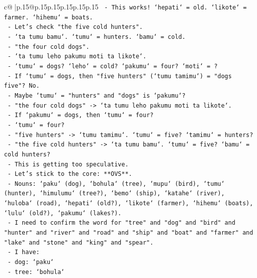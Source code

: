 \documentclass{article}
\begin{document}
{\begin{supertabular}{c@{$\;$}|p{.15\linewidth}@{}p{.15\linewidth}p{.15\linewidth}p{.15\linewidth}p{.15\linewidth}p{.15\linewidth}}
{{{\texttt{                {-} This works! `hepati` = old. `likote` = farmer. `hihemu` = boats.} \\
\texttt{                {-} Let's check "the five cold hunters".} \\
\texttt{                {-} `ta tumu bamu`. `tumu` = hunters. `bamu` = cold.} \\
\texttt{                {-} "the four cold dogs".} \\
\texttt{                {-} `ta tumu leho pakumu moti ta likote`.} \\
\texttt{                {-} `tumu` = dogs? `leho` = cold? `pakumu` = four? `moti` = ?} \\
\texttt{                {-} If `tumu` = dogs, then "five hunters" (`tumu tamimu`) = "dogs five"? No.} \\
\texttt{                {-} Maybe `tumu` = "hunters" and "dogs" is `pakumu`?} \\
\texttt{                {-} "the four cold dogs" {-}> `ta tumu leho pakumu moti ta likote`.} \\
\texttt{                {-} If `pakumu` = dogs, then `tumu` = four?} \\
\texttt{                {-} `tumu` = four?} \\
\texttt{                {-} "five hunters" {-}> `tumu tamimu`. `tumu` = five? `tamimu` = hunters?} \\
\texttt{                {-} "the five cold hunters" {-}> `ta tumu bamu`. `tumu` = five? `bamu` = cold hunters?} \\
\texttt{                {-} This is getting too speculative.} \\
\texttt{                {-} Let's stick to the core: **OVS**.} \\
\texttt{                {-} Nouns: `paku` (dog), `bohula` (tree), `mupu` (bird), `tumu` (hunter), `himulumu` (tree?), `bemo` (ship), `katahe` (river), `huloba` (road), `hepati` (old?), `likote` (farmer), `hihemu` (boats), `lulu` (old?), `pakumu` (lakes?).} \\
\texttt{                {-} I need to confirm the word for "tree" and "dog" and "bird" and "hunter" and "river" and "road" and "ship" and "boat" and "farmer" and "lake" and "stone" and "king" and "spear".} \\
\texttt{                {-} I have:} \\
\texttt{                  {-} dog: `paku`} \\
\texttt{                  {-} tree: `bohula`} \\
}}}
\end{supertabular}}
\end{document}

